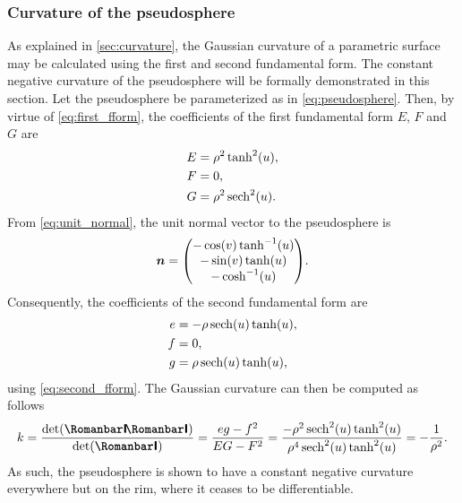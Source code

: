 \subsubsection{Curvature of the pseudosphere}
As explained in \cref{sec:curvature}, the Gaussian curvature of a parametric surface may be calculated using the first and second fundamental form. The constant negative curvature of the pseudosphere  will be formally demonstrated in this section. 
Let the pseudosphere be parameterized as in \cref{eq:pseudosphere}. Then, by virtue of \cref{eq:first_fform}, the coefficients of the first fundamental form \(E\), \(F\) and \(G\) are
\[
    \begin{split}
        E & = \rho^2\tanh[2](u), \\
        F & = 0, \\
        G & = \rho^2\sech[2](u). \\
    \end{split}
\]
From \cref{eq:unit_normal}, the unit normal vector to the pseudosphere is
\[
    \vec{n} 
    = \mqty(
        -\cos(v)\tanh[-1](u) \\
        -\sin(v)\tanh(u)\\
        -\cosh[-1](u)\\
    ).
\]
Consequently, the coefficients of the second fundamental form are
\begin{equation*}
    \begin{split}
        e &= -\rho\sech(u)\tanh(u),\\
        f &= 0,\\
        g &= \rho\sech(u)\tanh(u),\\
    \end{split}
\end{equation*}
using \cref{eq:second_fform}.
The Gaussian curvature can then be computed as follows \cite{ONeill2006}
\begin{equation}
    k = \frac{\det(\secondff)}{\det(\firstff)} = \frac{eg - f^2}{EG - F^2} 
    = \frac{-
    \rho^2\sech[2](u)\tanh[2](u)}{\rho^4\sech[2](u)\tanh[2](u)} = -\frac{1}{\rho^2}.
\end{equation}
As such, the pseudosphere is shown to have a constant negative curvature everywhere but on the rim, where it ceases to be differentiable.

